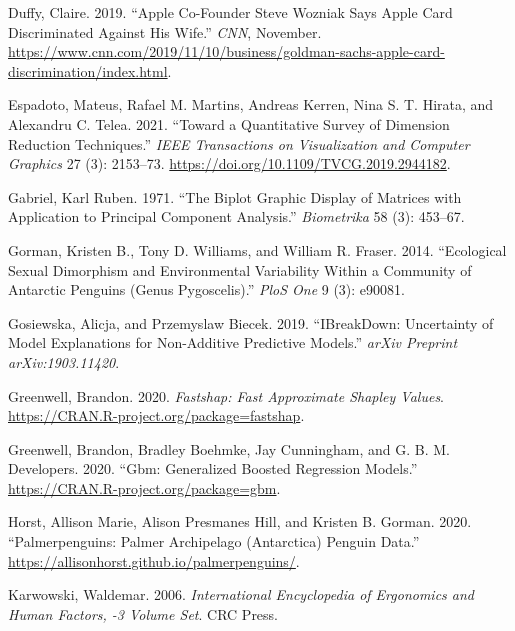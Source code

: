 \documentclass[11pt,twoside]{article}
\newlength{\cslhangindent}
\newlength{\cslentryspacingunit} %
\newenvironment{CSLReferences}[2] %
 {%
  \setlength{\parindent}{0pt}
  \ifodd #1
  \let\oldpar\par
  \def\par{\hangindent=\cslhangindent\oldpar}
  \fi
  \setlength{\parskip}{#2\cslentryspacingunit}
 }%
 {}
\begin{document}
\begin{CSLReferences}{1}{0}
\leavevmode\hypertarget{ref-duffy_apple_2019}{}%
Duffy, Claire. 2019. {``Apple Co-Founder {Steve} {Wozniak} Says {Apple} {Card} Discriminated Against His Wife.''} \emph{CNN}, November. \url{https://www.cnn.com/2019/11/10/business/goldman-sachs-apple-card-discrimination/index.html}.

\leavevmode\hypertarget{ref-espadoto_toward_2021}{}%
Espadoto, Mateus, Rafael M. Martins, Andreas Kerren, Nina S. T. Hirata, and Alexandru C. Telea. 2021. {``Toward a {Quantitative} {Survey} of {Dimension} {Reduction} {Techniques}.''} \emph{IEEE Transactions on Visualization and Computer Graphics} 27 (3): 2153--73. \url{https://doi.org/10.1109/TVCG.2019.2944182}.

\leavevmode\hypertarget{ref-gabriel_biplot_1971}{}%
Gabriel, Karl Ruben. 1971. {``The Biplot Graphic Display of Matrices with Application to Principal Component Analysis.''} \emph{Biometrika} 58 (3): 453--67.

\leavevmode\hypertarget{ref-gorman_ecological_2014}{}%
Gorman, Kristen B., Tony D. Williams, and William R. Fraser. 2014. {``Ecological Sexual Dimorphism and Environmental Variability Within a Community of {Antarctic} Penguins (Genus {Pygoscelis}).''} \emph{PloS One} 9 (3): e90081.

\leavevmode\hypertarget{ref-gosiewska_ibreakdown_2019}{}%
Gosiewska, Alicja, and Przemyslaw Biecek. 2019. {``{IBreakDown}: {Uncertainty} of Model Explanations for Non-Additive Predictive Models.''} \emph{arXiv Preprint arXiv:1903.11420}.

\leavevmode\hypertarget{ref-greenwell_fastshap_2020}{}%
Greenwell, Brandon. 2020. \emph{Fastshap: {Fast} {Approximate} {Shapley} {Values}}. \url{https://CRAN.R-project.org/package=fastshap}.

\leavevmode\hypertarget{ref-greenwell_gbm_2020}{}%
Greenwell, Brandon, Bradley Boehmke, Jay Cunningham, and G. B. M. Developers. 2020. {``Gbm: {Generalized} {Boosted} {Regression} {Models}.''} \url{https://CRAN.R-project.org/package=gbm}.

\leavevmode\hypertarget{ref-horst_palmerpenguins_2020}{}%
Horst, Allison Marie, Alison Presmanes Hill, and Kristen B. Gorman. 2020. {``Palmerpenguins: {Palmer} {Archipelago} ({Antarctica}) Penguin Data.''} \url{https://allisonhorst.github.io/palmerpenguins/}.

\leavevmode\hypertarget{ref-karwowski_international_2006}{}%
Karwowski, Waldemar. 2006. \emph{International {Encyclopedia} of {Ergonomics} and {Human} {Factors}, -3 {Volume} {Set}}. CRC Press.


\end{CSLReferences}
\end{document}
